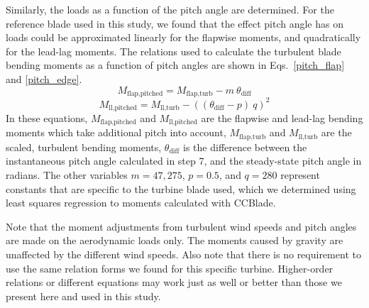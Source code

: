 \documentclass[11pt,letterpaper]{article}
\begin{document}
% 
Similarly, the loads as a function of the pitch angle are determined. For the reference blade used in this study, we found that the effect pitch angle has on loads could be approximated linearly for the flapwise moments, and quadratically for the lead-lag moments. The relations used to calculate the turbulent blade bending moments as a function of pitch angles are shown in Eqs.~\ref{pitch_flap} and \ref{pitch_edge}.
% 
\begin{equation}
    M_\text{flap,pitched} = M_{\text{flap,turb}} - m~ \theta_{\text{diff}}
    \label{pitch_flap}
\end{equation}
% 
\begin{equation}
    M_\text{ll,pitched} = M_{\text{ll,turb}} - ((\theta_{\text{diff}} - p)~q)^2
    \label{pitch_edge}
\end{equation}
In these equations, $M_\text{flap,pitched}$ and $M_\text{ll,pitched}$ are the flapwise and lead-lag bending moments which take additional pitch into account, $M_{\text{flap,turb}}$ and $M_{\text{ll,turb}}$ are the scaled, turbulent bending moments, $\theta_{\text{diff}}$ is the difference between the instantaneous pitch angle calculated in step 7, and the steady-state pitch angle in radians. The other variables $m=47{,}275$, $p=0.5$, and $q=280$ represent constants that are specific to the turbine blade used, which we determined using least squares regression to moments calculated with CCBlade.


Note that the moment adjustments from turbulent wind speeds and pitch angles are made on the aerodynamic loads only. The moments caused by gravity are unaffected by the different wind speeds. Also note that there is no requirement to use the same relation forms we found for this specific turbine. Higher-order relations or different equations may work just as well or better than those we present here and used in this study.
\end{document}
